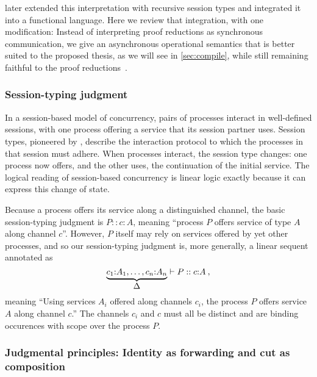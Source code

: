 \Textcite{Toninho+:ESOP13} later extended this interpretation with recursive session types and integrated it into a functional language.
Here we review that integration, with one modification:
Instead of interpreting proof reductions as synchronous communication, we give an asynchronous operational semantics that is better suited to the proposed thesis, as we will see in \cref{sec:compile}, while still remaining faithful to the proof reductions~\autocite{DeYoung+:CSL12}.

\subsubsection{Session-typing judgment}\label{sec:sess-typing-judgm}

In a session-based model of concurrency, pairs of processes interact in well-defined sessions, with one process offering a service that its session partner uses.
Session types, pioneered by \textcite{Honda:CONCUR93}, describe the interaction protocol to which the processes in that session must adhere.
When processes interact, the session type changes: one process now offers, and the other uses, the continuation of the initial service.
The logical reading of session-based concurrency is linear logic exactly because it can express this change of state.

Because a process offers its service along a distinguished channel, the basic session-typing judgment is $P :: c{:}A$, meaning \enquote{process $P$ offers service of type $A$ along channel $c$}.
However, $P$ itself may rely on services offered by yet other processes, and so our session-typing judgment is, more generally, a linear sequent annotated as
\begin{equation*}
  \underbrace{c_1{:}A_1, \dotsc, c_n{:}A_n}_{\displaystyle \Delta} \vdash P :: c{:}A \:,
\end{equation*}
meaning \enquote{Using services $A_i$ offered along channels $c_i$, the process $P$ offers service $A$ along channel $c$.}
The channels $c_i$ and $c$ must all be distinct and are binding occurences with scope over the process $P$.

\subsubsection{Judgmental principles: Identity as forwarding and cut as composition}\label{sec:judgm-princ}

